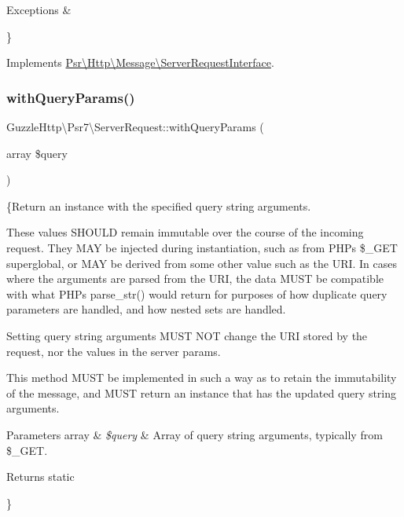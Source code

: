 \begin{DoxyExceptions}{Exceptions}
{\em } & \\
\hline
\end{DoxyExceptions}
\} 

Implements \hyperlink{interfacePsr_1_1Http_1_1Message_1_1ServerRequestInterface_ac8dbe5e28829d7cb0d5b753eb5df8bc9}{Psr\textbackslash{}\+Http\textbackslash{}\+Message\textbackslash{}\+Server\+Request\+Interface}.

\mbox{\label{classGuzzleHttp_1_1Psr7_1_1ServerRequest_aba139e3a3df11236f0ee70c1571dbf4a}} 
\subsubsection{\texorpdfstring{with\+Query\+Params()}{withQueryParams()}}
{\footnotesize\ttfamily Guzzle\+Http\textbackslash{}\+Psr7\textbackslash{}\+Server\+Request\+::with\+Query\+Params (\begin{DoxyParamCaption}\item[{array}]{\$query }\end{DoxyParamCaption})}

\{Return an instance with the specified query string arguments.

These values S\+H\+O\+U\+LD remain immutable over the course of the incoming request. They M\+AY be injected during instantiation, such as from P\+HP\textquotesingle{}s \$\+\_\+\+G\+ET superglobal, or M\+AY be derived from some other value such as the U\+RI. In cases where the arguments are parsed from the U\+RI, the data M\+U\+ST be compatible with what P\+HP\textquotesingle{}s parse\+\_\+str() would return for purposes of how duplicate query parameters are handled, and how nested sets are handled.

Setting query string arguments M\+U\+ST N\+OT change the U\+RI stored by the request, nor the values in the server params.

This method M\+U\+ST be implemented in such a way as to retain the immutability of the message, and M\+U\+ST return an instance that has the updated query string arguments.


\begin{DoxyParams}[1]{Parameters}
array & {\em \$query} & Array of query string arguments, typically from \$\+\_\+\+G\+ET. \\
\hline
\end{DoxyParams}
\begin{DoxyReturn}{Returns}
static
\end{DoxyReturn}
\} 

